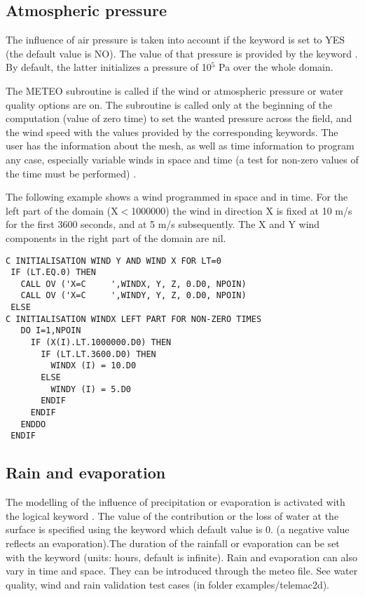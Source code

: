 \subsection{ Atmospheric pressure}

 The influence of air pressure is taken into account if the keyword  is set to YES (the default value is NO). The value of that pressure is provided by the keyword . By default, the latter initializes a pressure of 10${}^{5}$ Pa over the whole domain.

 The METEO subroutine is called if the wind or atmospheric pressure or water quality options are on. The subroutine is called only at the beginning of the computation (value of zero time) to set the wanted pressure across the field, and the wind speed with the values {}{}provided by the corresponding keywords. The user has the information about the mesh, as well as time information to program any case, especially variable winds in space and time (a test for non-zero values {}{}of the time must be performed) .

 The following example shows a wind programmed in space and in time. For the left part of the domain (X$<$1000000) the wind in direction X is fixed at 10 m/s for the first 3600 seconds, and at 5 m/s subsequently. The X and Y wind components in the right part of the domain are nil.

\begin{lstlisting}[language=TelFortran]
C INITIALISATION WIND Y AND WIND X FOR LT=0
 IF (LT.EQ.0) THEN
   CALL OV ('X=C     ',WINDX, Y, Z, 0.D0, NPOIN)
   CALL OV ('X=C     ',WINDY, Y, Z, 0.D0, NPOIN)
 ELSE
C INITIALISATION WINDX LEFT PART FOR NON-ZERO TIMES
   DO I=1,NPOIN
     IF (X(I).LT.1000000.D0) THEN
       IF (LT.LT.3600.D0) THEN
         WINDX (I) = 10.D0
       ELSE
         WINDY (I) = 5.D0
       ENDIF
     ENDIF
   ENDDO
 ENDIF
\end{lstlisting}
\subsection{ Rain and evaporation}

 The modelling of the influence of precipitation or evaporation is activated with the logical keyword . The value of the contribution or the loss of water at the surface is specified using the keyword  which default value is 0. (a negative value reflects an evaporation).The duration of the rainfall or evaporation can be set with the keyword  (units: hours, default is infinite). Rain and evaporation can also vary in time and space. They can be introduced through the meteo file. See water quality, wind and rain validation test cases (in folder examples/telemac2d).

